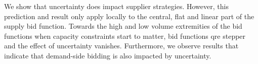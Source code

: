 \label{introresults}
We show that uncertainty does impact supplier strategies. However, this prediction and result only apply locally to the central, flat and linear part of the supply bid function. Towards the high and low volume extremities of the bid functions when capacity constraints start to matter, bid functions qre stepper and the effect of uncertainty vanishes. Furthermore, we observe results that indicate that demand-side bidding is also impacted by uncertainty.  \\


